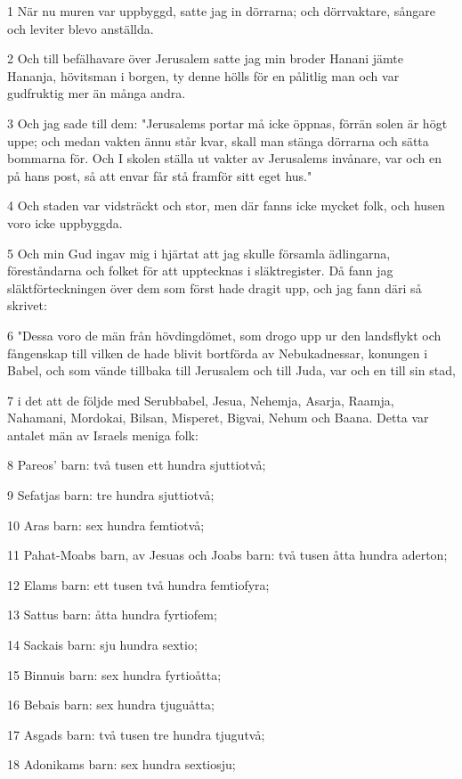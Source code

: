 \par 1 När nu muren var uppbyggd, satte jag in dörrarna; och dörrvaktare, sångare och leviter blevo anställda.
\par 2 Och till befälhavare över Jerusalem satte jag min broder Hanani jämte Hananja, hövitsman i borgen, ty denne hölls för en pålitlig man och var gudfruktig mer än många andra.
\par 3 Och jag sade till dem: "Jerusalems portar må icke öppnas, förrän solen är högt uppe; och medan vakten ännu står kvar, skall man stänga dörrarna och sätta bommarna för. Och I skolen ställa ut vakter av Jerusalems invånare, var och en på hans post, så att envar får stå framför sitt eget hus."
\par 4 Och staden var vidsträckt och stor, men där fanns icke mycket folk, och husen voro icke uppbyggda.
\par 5 Och min Gud ingav mig i hjärtat att jag skulle församla ädlingarna, föreståndarna och folket för att upptecknas i släktregister. Då fann jag släktförteckningen över dem som först hade dragit upp, och jag fann däri så skrivet:
\par 6 "Dessa voro de män från hövdingdömet, som drogo upp ur den landsflykt och fångenskap till vilken de hade blivit bortförda av Nebukadnessar, konungen i Babel, och som vände tillbaka till Jerusalem och till Juda, var och en till sin stad,
\par 7 i det att de följde med Serubbabel, Jesua, Nehemja, Asarja, Raamja, Nahamani, Mordokai, Bilsan, Misperet, Bigvai, Nehum och Baana. Detta var antalet män av Israels meniga folk:
\par 8 Pareos' barn: två tusen ett hundra sjuttiotvå;
\par 9 Sefatjas barn: tre hundra sjuttiotvå;
\par 10 Aras barn: sex hundra femtiotvå;
\par 11 Pahat-Moabs barn, av Jesuas och Joabs barn: två tusen åtta hundra aderton;
\par 12 Elams barn: ett tusen två hundra femtiofyra;
\par 13 Sattus barn: åtta hundra fyrtiofem;
\par 14 Sackais barn: sju hundra sextio;
\par 15 Binnuis barn: sex hundra fyrtioåtta;
\par 16 Bebais barn: sex hundra tjuguåtta;
\par 17 Asgads barn: två tusen tre hundra tjugutvå;
\par 18 Adonikams barn: sex hundra sextiosju;
